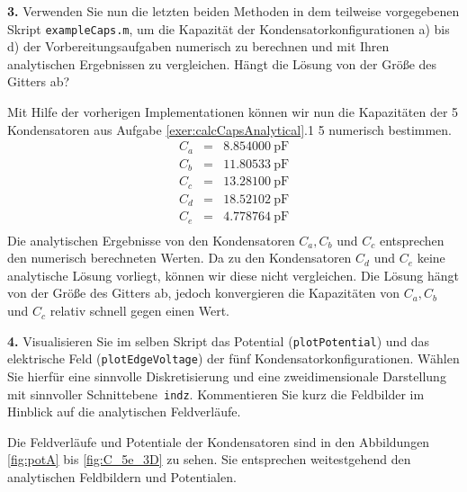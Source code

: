 \documentclass[Protokollheft.tex]{subfiles}
\begin{document}
\begin{framed}
	\noindent \textbf{3.} Verwenden Sie nun die letzten beiden Methoden in dem teilweise vorgegebenen Skript \lstinline{exampleCaps.m}, um
die Kapazität der Kondensatorkonfigurationen a) bis d) der Vorbereitungsaufgaben numerisch zu berechnen und mit Ihren analytischen Ergebnissen zu vergleichen. Hängt die Lösung von der Größe des Gitters ab?\label{exer:calcCapNumerically}
\end{framed}
\noindent
Mit Hilfe der vorherigen Implementationen können wir nun die Kapazitäten der 5 Kondensatoren aus Aufgabe \ref{exer:calcCapsAnalytical}.1 5 numerisch bestimmen.
\begin{eqnarray*}
C_a &=& 8.854000\ \text{pF}\\
C_b &=& 11.80533\ \text{pF}\\
C_c &=& 13.28100\ \text{pF}\\
C_d &=& 18.52102\ \text{pF}\\
C_e &=& 4.778764\ \text{pF}\\
\end{eqnarray*}
\noindent
Die analytischen Ergebnisse von den Kondensatoren $C_a, C_b$ und $C_c$ entsprechen den numerisch berechneten Werten. Da zu den Kondensatoren $C_d$ und $C_e$ keine analytische Lösung vorliegt, können wir diese nicht vergleichen. Die Lösung hängt von der Größe des Gitters ab, jedoch konvergieren die Kapazitäten von $C_a, C_b$ und $C_c$ relativ schnell gegen einen Wert. 
\begin{framed}
	\noindent \textbf{4.} Visualisieren Sie im selben Skript das Potential (\lstinline{plotPotential}) und das elektrische Feld (\lstinline{plotEdgeVoltage})
der fünf Kondensatorkonfigurationen. Wählen Sie hierfür eine sinnvolle Diskretisierung und eine zweidimensionale Darstellung mit sinnvoller Schnittebene~\lstinline{indz}. Kommentieren Sie kurz die Feldbilder im Hinblick auf die analytischen Feldverläufe.\label{exer:visualizeCapField}
\end{framed}
\noindent
Die Feldverläufe und Potentiale der Kondensatoren sind in den Abbildungen \ref{fig:potA} bis \ref{fig:C_5e_3D} zu sehen. Sie entsprechen weitestgehend den analytischen Feldbildern und Potentialen.
\end{document}
